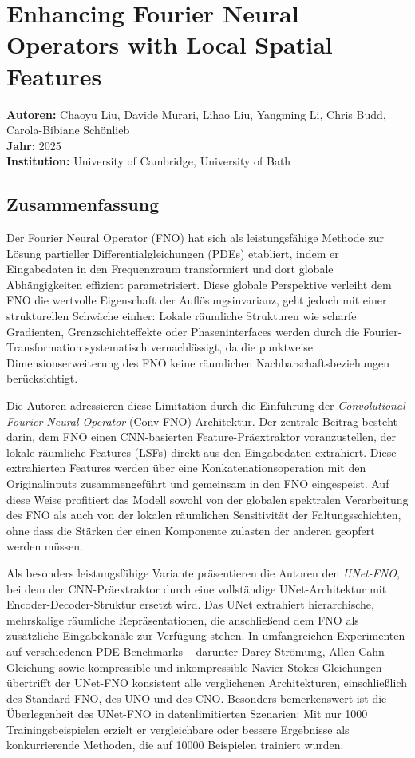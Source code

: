 \documentclass[a4paper,12pt]{article}
\begin{document}
\section*{Enhancing Fourier Neural Operators with Local Spatial Features}
\textbf{Autoren:} Chaoyu Liu, Davide Murari, Lihao Liu, Yangming Li, Chris Budd, Carola-Bibiane Schönlieb \\
\textbf{Jahr:} 2025 \\
\textbf{Institution:} University of Cambridge, University of Bath

\subsection*{Zusammenfassung}

Der Fourier Neural Operator (FNO) hat sich als leistungsfähige Methode zur Lösung partieller Differentialgleichungen (PDEs) etabliert, indem er Eingabedaten in den Frequenzraum transformiert und dort globale Abhängigkeiten effizient parametrisiert. Diese globale Perspektive verleiht dem FNO die wertvolle Eigenschaft der Auflösungsinvarianz, geht jedoch mit einer strukturellen Schwäche einher: Lokale räumliche Strukturen wie scharfe Gradienten, Grenzschichteffekte oder Phaseninterfaces werden durch die Fourier-Transformation systematisch vernachlässigt, da die punktweise Dimensionserweiterung des FNO keine räumlichen Nachbarschaftsbeziehungen berücksichtigt.

Die Autoren adressieren diese Limitation durch die Einführung der \emph{Convolutional Fourier Neural Operator} (Conv-FNO)-Architektur. Der zentrale Beitrag besteht darin, dem FNO einen CNN-basierten Feature-Präextraktor voranzustellen, der lokale räumliche Features (LSFs) direkt aus den Eingabedaten extrahiert. Diese extrahierten Features werden über eine Konkatenationsoperation mit den Originalinputs zusammengeführt und gemeinsam in den FNO eingespeist. Auf diese Weise profitiert das Modell sowohl von der globalen spektralen Verarbeitung des FNO als auch von der lokalen räumlichen Sensitivität der Faltungsschichten, ohne dass die Stärken der einen Komponente zulasten der anderen geopfert werden müssen.

Als besonders leistungsfähige Variante präsentieren die Autoren den \emph{UNet-FNO}, bei dem der CNN-Präextraktor durch eine vollständige UNet-Architektur mit Encoder-Decoder-Struktur ersetzt wird. Das UNet extrahiert hierarchische, mehrskalige räumliche Repräsentationen, die anschließend dem FNO als zusätzliche Eingabekanäle zur Verfügung stehen. In umfangreichen Experimenten auf verschiedenen PDE-Benchmarks -- darunter Darcy-Strömung, Allen-Cahn-Gleichung sowie kompressible und inkompressible Navier-Stokes-Gleichungen -- übertrifft der UNet-FNO konsistent alle verglichenen Architekturen, einschließlich des Standard-FNO, des UNO und des CNO. Besonders bemerkenswert ist die Überlegenheit des UNet-FNO in datenlimitierten Szenarien: Mit nur 1000 Trainingsbeispielen erzielt er vergleichbare oder bessere Ergebnisse als konkurrierende Methoden, die auf 10000 Beispielen trainiert wurden.
\end{document}
